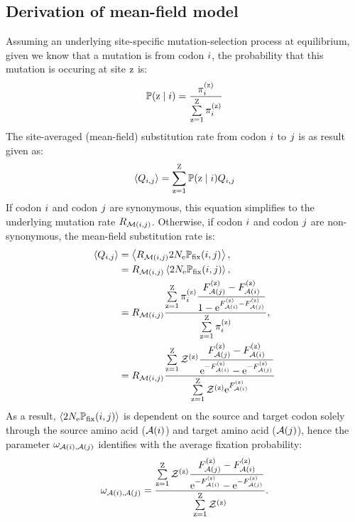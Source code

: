 \subsection{Derivation of mean-field model}
\label{subsec:mean-field-derivation}
Assuming an underlying site-specific mutation-selection process at equilibrium, given we know that a mutation is from codon ${i}$, the probability that this mutation is occuring at site $\text{z}$ is:
\begin{align}
    \mathbb{P} (\text{z} \mid {i}) = \dfrac{ \pi_{{i}}^{(\text{z})} }{\sum\limits_{\text{z}=1}^{\text{Z}} \pi_{{i}}^{(\text{z})} }
\end{align}
The site-averaged (mean-field) substitution rate from codon ${i}$ to ${j}$ is as result given as:
\begin{align}
    \left\langle Q_{{i}, {j}} \right\rangle = \sum\limits_{\text{z}=1}^{\text{Z}} \mathbb{P} (\text{z} \mid {i}) Q_{{i}, {j}}
\end{align}
If codon ${i}$ and codon ${j}$ are synonymous, this equation simplifies to the underlying mutation rate $R_{\mathcal{M}({i}, {j})}$.
Otherwise, if codon ${i}$ and codon ${j}$ are non-synonymous, the mean-field substitution rate is:
\begin{align}
    \left\langle Q_{{i}, {j}} \right\rangle & = \left\langle R_{\mathcal{M}({i}, {j})} 2 N_{\text{e}} \mathbb{P}_{\text{fix}} ({i}, {j}) \right\rangle, \\
    & = R_{\mathcal{M}({i}, {j})} \left\langle 2 N_{\text{e}} \mathbb{P}_{\text{fix}} ({i}, {j}) \right\rangle, \\
    & = R_{\mathcal{M}({i}, {j})} \dfrac{ \sum\limits_{\text{z}=1}^{\text{Z}} \pi_{{i}}^{(\text{z})} \dfrac{F_{\mathcal{A}({j})}^{(\text{z})} - F_{\mathcal{A}({i})}^{(\text{z})}}{1 - \text{e}^{F_{\mathcal{A}({i})}^{(\text{z})} - F_{\mathcal{A}({j})}^{(\text{z})}}} }{ \sum\limits_{\text{z}=1}^{\text{Z}} \pi_{{i}}^{(\text{z})} }, \\
    & = R_{\mathcal{M}({i}, {j})} \dfrac{ \sum\limits_{\text{z}=1}^{\text{Z}} \mathcal{Z}^{(\text{z})}  \dfrac{F_{\mathcal{A}({j})}^{(\text{z})} - F_{\mathcal{A}({i})}^{(\text{z})}}{ \text{e}^{-F_{\mathcal{A}({i})}^{(\text{z})}} - \text{e}^{ - F_{\mathcal{A}({j})}^{(\text{z})}}} }{  \sum\limits_{\text{z}=1}^{\text{Z}} \mathcal{Z}^{(\text{z})} \text{e}^{F_{\mathcal{A}({i})}^{(\text{z})}} }
\end{align}
As a result, $\left\langle 2 N_{\text{e}} \mathbb{P}_{\text{fix}} ({i}, {j}) \right\rangle$ is dependent on the source and target codon solely through the source amino acid ($\mathcal{A}({i})$) and target amino acid ($\mathcal{A}({j})$), hence the parameter $\omega_{\mathcal{A}({i}), \mathcal{A}({j})}$ identifies with the average fixation probability:
\begin{equation}
    \omega_{\mathcal{A}({i}), \mathcal{A}({j})} = \dfrac{ \sum\limits_{\text{z}=1}^{\text{Z}} \mathcal{Z}^{(\text{z})}  \dfrac{F_{\mathcal{A}({j})}^{(\text{z})} - F_{\mathcal{A}({i})}^{(\text{z})}}{ \text{e}^{-F_{\mathcal{A}({i})}^{(\text{z})}} - \text{e}^{ - F_{\mathcal{A}({j})}^{(\text{z})}}} }{  \sum\limits_{\text{z}=1}^{\text{Z}} \mathcal{Z}^{(\text{z})}  }.
\end{equation}

